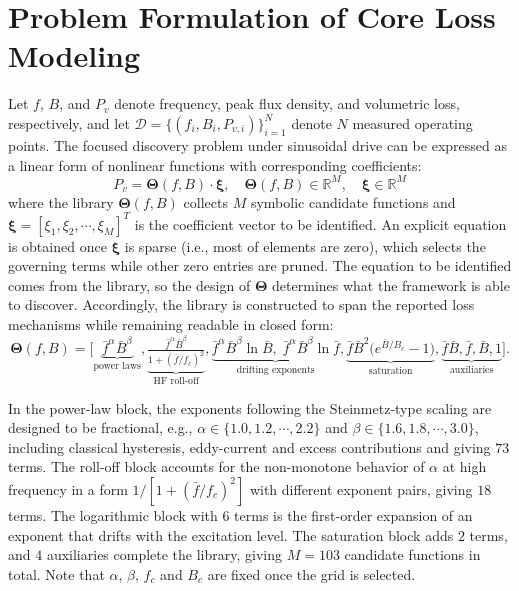 \section{Problem Formulation of Core Loss Modeling}
Let $f$, $B$, and $P_{v}$ denote frequency, peak flux density, and volumetric loss, respectively, and let $\mathcal{D}=\{(f_i, B_i, P_{v,i})\}_{i=1}^{N}$ denote $N$ measured operating points. The focused discovery problem under sinusoidal drive can be expressed as a linear form of nonlinear functions with corresponding coefficients:
\begin{equation}
    P_{v} = \boldsymbol{\Theta}(f, B) \cdot \boldsymbol{\xi}, \quad \boldsymbol{\Theta}(f, B)\in\mathbb{R}^{M}, \quad \boldsymbol{\xi}\in\mathbb{R}^{M}
    \label{eq:ssi_form}
\end{equation}
where the library $\boldsymbol{\Theta}(f, B)$ collects $M$ symbolic candidate functions and $\boldsymbol{\xi}=\left[\xi_1, \xi_2, \cdots, \xi_M \right]^{T}$ is the coefficient vector to be identified. An explicit equation is obtained once $\boldsymbol{\xi}$ is sparse (i.e., most of elements are zero), which selects the governing terms while other zero entries are pruned. The equation to be identified comes from the library, so the design of $\boldsymbol{\Theta}$ determines what the framework is able to discover. Accordingly, the library is constructed to span the reported loss mechanisms while remaining readable in closed form:
\begin{equation}
    \boldsymbol{\Theta}(f, B) =
    \Big[\underbrace{\bar{f}^{\alpha}\bar{B}^{\beta}}_{\text{power laws}} ,
    \underbrace{\tfrac{\bar{f}^{\alpha}\bar{B}^{\beta}}{1+(\bar{f}/f_c)^{2}}}_{\text{HF roll-off}} ,
    \underbrace{\bar{f}^{\alpha}\bar{B}^{\beta}\ln\bar{B},\;\bar{f}^{\alpha}\bar{B}^{\beta}\ln\bar{f}}_{\text{drifting exponents}} ,
    \underbrace{\bar{f}\bar{B}^{2}\big(e^{\bar{B}/B_c}\!-\!1\big)}_{\text{saturation}} ,
    \underbrace{\bar{f}\bar{B},\bar{f},\bar{B},1}_{\text{auxiliaries}} \Big].
    \label{eq:library}
\end{equation}

In the power-law block, the exponents following the Steinmetz-type scaling are designed to be fractional, e.g., $\alpha\in\{1.0,1.2,\cdots,2.2\}$ and $\beta\in\{1.6,1.8,\cdots,3.0\}$, including classical hysteresis, eddy-current and excess contributions and giving $73$ terms. The roll-off block accounts for the non-monotone behavior of $\alpha$ at high frequency in a form $1/[1+(\bar{f}/f_c)^{2}]$ with different exponent pairs, giving $18$ terms. The logarithmic block with $6$ terms is the first-order expansion of an exponent that drifts with the excitation level. The saturation block adds $2$ terms, and $4$ auxiliaries complete the library, giving $M=103$ candidate functions in total. Note that $\alpha$, $\beta$, $f_c$ and $B_c$ are fixed once the grid is selected.


